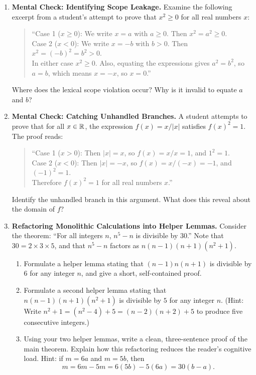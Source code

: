 \begin{enumerate}
  \item \textbf{Mental Check: Identifying Scope Leakage.}
  Examine the following excerpt from a student's attempt to prove that $x^2 \ge 0$ for all real numbers $x$:
  \begin{quote}
  ``Case 1 ($x \ge 0$): We write $x = a$ with $a \ge 0$. Then $x^2 = a^2 \ge 0$.\\
  Case 2 ($x < 0$): We write $x = -b$ with $b > 0$. Then $x^2 = (-b)^2 = b^2 > 0$.\\
  In either case $x^2 \ge 0$. Also, equating the expressions gives $a^2 = b^2$, so $a = b$, which means $x = -x$, so $x = 0$.''
  \end{quote}
  Where does the lexical scope violation occur? Why is it invalid to equate $a$ and $b$?

  \item \textbf{Mental Check: Catching Unhandled Branches.}
  A student attempts to prove that for all $x \in \mathbb{R}$, the expression $f(x) = x / \lvert x \rvert$ satisfies $f(x)^2 = 1$. The proof reads:
  \begin{quote}
  ``Case 1 ($x > 0$): Then $|x| = x$, so $f(x) = x/x = 1$, and $1^2 = 1$.\\
  Case 2 ($x < 0$): Then $|x| = -x$, so $f(x) = x/(-x) = -1$, and $(-1)^2 = 1$.\\
  Therefore $f(x)^2 = 1$ for all real numbers $x$.''
  \end{quote}
  Identify the unhandled branch in this argument. What does this reveal about the domain of $f$?

  \item \textbf{Refactoring Monolithic Calculations into Helper Lemmas.}
  Consider the theorem: ``For all integers $n$, $n^5 - n$ is divisible by $30$.''
  Note that $30 = 2 \times 3 \times 5$, and that $n^5 - n$ factors as $n(n-1)(n+1)(n^2+1)$.
  \begin{enumerate}[label=(\alph*)]
    \item Formulate a helper lemma stating that $(n-1)n(n+1)$ is divisible by $6$ for any integer $n$, and give a short, self-contained proof.
    \item Formulate a second helper lemma stating that $n(n-1)(n+1)(n^2+1)$ is divisible by $5$ for any integer $n$. (Hint: Write $n^2 + 1 = (n^2 - 4) + 5 = (n-2)(n+2) + 5$ to produce five consecutive integers.)
    \item Using your two helper lemmas, write a clean, three-sentence proof of the main theorem. Explain how this refactoring reduces the reader's cognitive load. Hint: if $m = 6a$ and $m = 5b$, then
    \[
    m = 6m - 5m = 6(5b) - 5(6a) = 30(b - a).
    \]
  \end{enumerate}


\end{enumerate}
